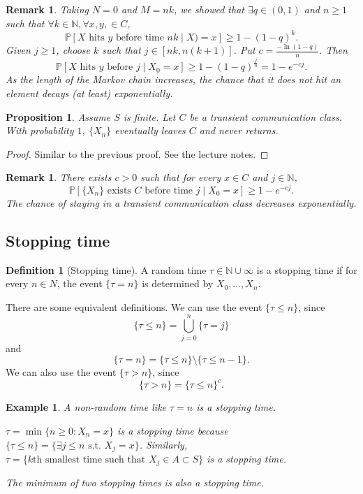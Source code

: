 \documentclass{tufte-handout}
\newcommand*\N{\mathbb{N}}
\renewcommand*\P{\mathbb{P}}
\newtheorem{rmk}[thm]{Remark}
\newtheorem{ex}[thm]{Example}
\newtheorem{prop}[thm]{Proposition}
\theoremstyle{definition}
\newtheorem{defn}[thm]{Definition}
\begin{document}
\begin{rmk}
	Taking $N = 0$ and $M = nk$, we showed that $\exists  q \in (0,1)$ and $n \ge 1$ such that $\forall  k \in \N, \forall x,y, \in C$, \[
		\P\left[X \text{ hits $y$ before time $nk$} \mid X) = x\right] \ge 1- (1-q)^{k}
	.\] 
	Given $j\ge 1$, choose $k$ such that $j \in \left[ nk, n(k+1) \right]$. Put $c = \frac{-\ln{(1-q)}}{n}$. Then \[
		\P\left[X \text{ hits $y$ before $j$} \mid X_0 = x\right] \ge 1 - (1-q)^{\frac{j}{n}} = 1-e^{-cj}
	.\] As the length of the Markov chain increases, the chance that it does not hit an element decays (at least) exponentially.
\end{rmk}

\begin{prop}
	Assume $S$ is finite. Let $C$ be a transient communication class. With probability $1$, $\{X_n\}$ eventually leaves $C$ and never returns.
\end{prop}

\begin{proof}
	Similar to the previous proof. See the lecture notes. 
\end{proof}

\begin{rmk}
	There exists $c > 0$ such that for every $x \in C$ and $j \in \N$, \[
		\P\left[\{X_n\} \text{ exists $C$ before time } j \mid X_0 = x\right] \ge 1-e^{-cj}
	.\] 
	The chance of staying in a transient communication class decreases exponentially.
\end{rmk}

\subsection{Stopping time}

\begin{defn}[Stopping time]
	A random time $\tau \in \N \cup \infty$ is a stopping time if for every $n \in N$, the event $\{\tau = n\}$ is determined by $X_0, \ldots,X_n$.

	There are some equivalent definitions. We can use the event $\{\tau \le n\}$, since \[
		\{\tau \le n\} = \bigcup\limits_{j=0}^{n} \{\tau=j\}
	\] and \[
		\{\tau = n\} = \{\tau \le n\} \setminus \{\tau \le n-1\}
	.\] We can also use the event $\{\tau > n\}$, since \[
		\{\tau > n\} = \{\tau \le n\}^c
	.\] 
\end{defn}

\begin{ex}
	A non-random time like $\tau = n$ is a stopping time.

	$\tau = \min \{n \ge 0: X_n = x\}$ is a stopping time because $\{\tau \le n\} = \{\exists  j \le n \text{ s.t. } X_j = x\}$. Similarly, $\tau = \{k\text{th smallest time such that } X_j \in A \subset S\}$ is a stopping time.

	The minimum of two stopping times is also a stopping time.
\end{ex}
\end{document}
